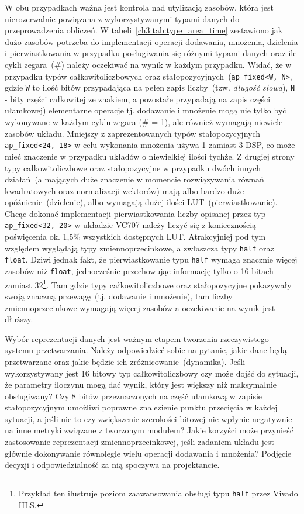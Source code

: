 W obu przypadkach ważna jest kontrola nad utylizacją zasobów, która jest nierozerwalnie powiązana z wykorzystywanymi typami danych do przeprowadzenia obliczeń. W tabeli~\ref{ch3:tab:type_area_time} zestawiono jak dużo zasobów potrzeba do implementacji operacji dodawania, mnożenia, dzielenia i pierwiastkowania w przypadku posługiwania się różnymi typami danych oraz ile cykli zegara~(\#) należy oczekiwać na wynik w każdym przypadku. Widać, że w przypadku typów całkowitoliczbowych oraz stałopozycyjnych~(\texttt{ap\_fixed<W, N>}, gdzie \texttt{W} to ilość bitów przypadająca na pełen zapis liczby~(tzw. \textit{długość słowa}), \texttt{N} - bity części całkowitej ze znakiem, a pozostałe przypadają na zapis części ułamkowej) elementarne operacje tj. dodawanie i mnożenie mogą nie tylko być wykonywane w każdym cyklu zegara (\# = 1), ale również wymagają niewiele zasobów układu. Mniejszy z zaprezentowanych typów stałopozycyjnych \texttt{ap\_fixed\textless{}24, 18\textgreater{}} w celu wykonania mnożenia używa 1 zamiast 3 DSP, co może mieć znaczenie w przypadku układów o niewielkiej ilości tychże. Z drugiej strony typy całkowitoliczbowe oraz stałopozycyjne w przypadku dwóch innych działań~(a mających duże znaczenie w momencie rozwiązywania równań kwadratowych oraz normalizacji wektorów) mają albo bardzo duże opóźnienie~(dzielenie), albo wymagają dużej ilości LUT~(pierwiastkowanie). Chcąc dokonać implementacji pierwiastkowania liczby opisanej przez typ \texttt{ap\_fixed\textless{}32, 20\textgreater{}} w układzie VC707 należy liczyć się z koniecznością poświęcenia ok. 1,5\% wszystkich dostępnych LUT. Atrakcyjniej pod tym względem wyglądają typy zmiennoprzecinkowe, a zwłaszcza typy \texttt{half} oraz \texttt{float}. Dziwi jednak fakt, że pierwiastkowanie typu \texttt{half} wymaga znacznie więcej zasobów niż \texttt{float}, jednocześnie przechowując informację tylko o 16 bitach zamiast 32\footnote{Przykład ten ilustruje poziom zaawansowania obsługi typu \texttt{half} przez Vivado HLS.}. Tam gdzie typy całkowitoliczbowe oraz stałopozycyjne pokazywały swoją znaczną przewagę~(tj. dodawanie i mnożenie), tam liczby zmiennoprzecinkowe wymagają więcej zasobów a oczekiwanie na wynik jest dłuższy.  

Wybór reprezentacji danych jest ważnym etapem tworzenia rzeczywistego systemu przetwarzania. Należy odpowiedzieć sobie na pytanie, jakie dane będą przetwarzane oraz jakie będzie ich zróżnicowanie~(dynamika). Jeśli wykorzystywany jest 16 bitowy typ całkowitoliczbowy czy może dojść do sytuacji, że parametry iloczynu mogą dać wynik, który jest większy niż maksymalnie obsługiwany? Czy 8 bitów przeznaczonych na część ułamkową w zapisie stałopozycyjnym umożliwi poprawne znalezienie punktu przecięcia w każdej sytuacji, a jeśli nie to czy zwiększenie szerokości bitowej nie wpłynie negatywnie na inne metryki związane z tworzonym modułem? Jakie korzyści może przynieść zastosowanie reprezentacji zmiennoprzecinkowej, jeśli zadaniem układu jest głównie dokonywanie równolegle wielu operacji dodawania i mnożenia?  Podjęcie decyzji i odpowiedzialność za nią spoczywa na projektancie.

